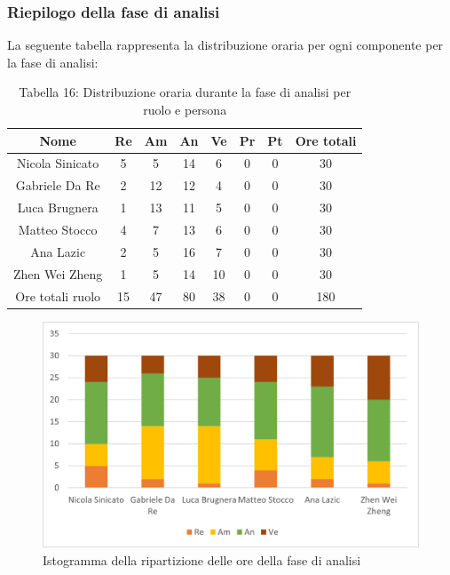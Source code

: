 \subsubsection{Riepilogo della fase di analisi}
%
La seguente tabella rappresenta la distribuzione oraria per ogni componente per la fase di analisi:
\begin{table}[h]
	\setlength\extrarowheight{5pt}
	\centering
	\begin{tabularx}{\textwidth}{|ccccccc|c|}
		\hline
		\rowcolor{white}
		\textbf{Nome} & \textbf{Re} & \textbf{Am} & \textbf{An} & \textbf{Ve} & \textbf{Pr}& \textbf{Pt} & \textbf{Ore totali} \\
		\hline
		Nicola Sinicato &5&5&14&6&0&0&30 \\
		Gabriele Da Re &2&12&12&4&0&0&30 \\
		Luca Brugnera &1&13&11&5&0&0&30 \\
		Matteo Stocco &4&7&13&6&0&0&30 \\
		Ana Lazic &2&5&16&7&0&0&30 \\
		Zhen Wei Zheng &1&5&14&10&0&0&30 \\
		\hline
		Ore totali ruolo &15&47&80&38&0&0&180 \\
		\hline
	\end{tabularx}
	\vspace{10pt}
	\caption{Tabella 16: Distribuzione oraria durante la fase di analisi per ruolo e persona}
\end{table}
\begin{figure}[H]
    \centering
    \includegraphics[scale=0.6]{img/grafi preventivo/istogrammi/analisi/complessivo.png}
    \caption{Istogramma della ripartizione delle ore della fase di analisi}
\end{figure}
